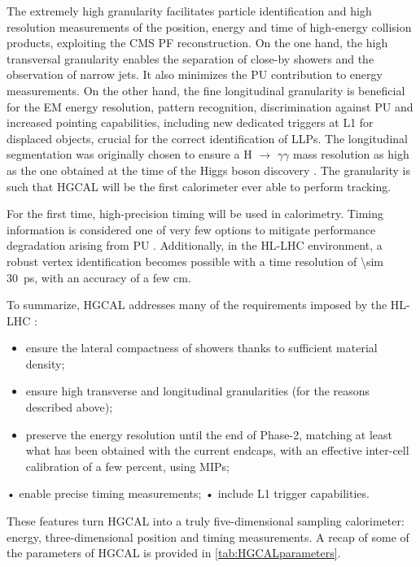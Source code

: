 \documentclass[11pt]{article}
\newcommand{\hgg}{H $\rightarrow$ $\gamma\gamma$}
\newcommand{\phase}[1]{Phase-#1}
\begin{document}
The extremely high granularity facilitates particle identification and high resolution measurements of the position, energy and time of high-energy collision products, exploiting the \ac{CMS} \ac{PF} reconstruction.
On the one hand, the high transversal granularity enables the separation of close-by showers and the observation of narrow jets.
It also minimizes the \ac{PU} contribution to energy measurements.
On the other hand, the fine longitudinal granularity is beneficial for the \ac{EM} energy resolution, pattern recognition, discrimination against \ac{PU} and increased pointing capabilities, including new dedicated triggers at \ac{L1} for displaced objects, crucial for the correct identification of \acp{LLP}.
The longitudinal segmentation was originally chosen to ensure a \hgg{} mass resolution as high as the one obtained at the time of the Higgs boson discovery \cite{hgcalTDR}.
The granularity is such that \ac{HGCAL} will be the first calorimeter ever able to perform tracking.

For the first time, high-precision timing will be used in calorimetry.
Timing information is considered one of very few options to mitigate performance degradation arising from \ac{PU} \cite{wigmans2}.
Additionally, in the \ac{HL-LHC} environment, a robust vertex identification becomes possible with a time resolution of \SI{\sim 30}{\pico\second}, with an accuracy of a few \si{\cm}.

To summarize, \ac{HGCAL} addresses many of the requirements imposed by the \ac{HL-LHC} \cite{hgcalTDR}:

\begin{itemize}
\item ensure the lateral compactness of showers thanks to sufficient material density;
\item ensure high transverse and longitudinal granularities (for the reasons described above);
\item preserve the energy resolution until the end of \phase{2}, matching at least what has been obtained with the current endcaps, with an effective inter-cell calibration of a few percent, using \acp{MIP};
\end{itemize}
• enable precise timing measurements;
• include \ac{L1} trigger capabilities.

\noindent These features turn \ac{HGCAL} into a truly five-dimensional sampling calorimeter: energy, three-dimensional position and timing measurements.
A recap of some of the parameters of \ac{HGCAL} is provided in \cref{tab:HGCALparameters}.
\end{document}
